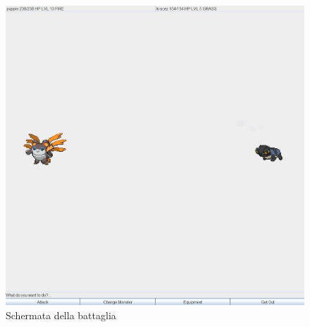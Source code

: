 \begin{figure}[H]
\centering
\includegraphics[scale=\x]{Screenshot/battle_panel.jpg}
\caption{Schermata della battaglia}
\label{img:battle}
\end{figure}

